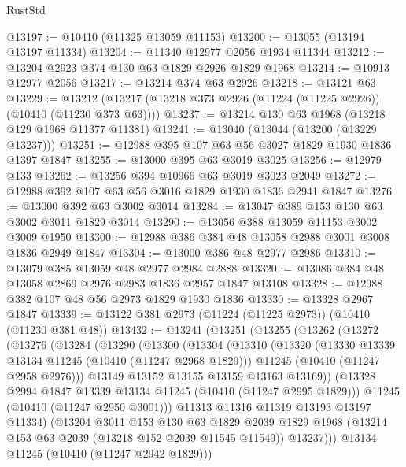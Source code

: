 \begin{lexlean}{RustStd}
\begin{coremodule}
@13197 := @10410 (@11325 @13059 @11153)
@13200 := @13055 (@13194 @13197 @11334)
@13204 := @11340 @12977 @2056 @1934 @11344
@13212 := @13204 @2923 @374 @130 @63 @1829 @2926 @1829 @1968
@13214 := @10913 @12977 @2056
@13217 := @13214 @374 @63 @2926
@13218 := @13121 @63
@13229 := @13212 (@13217 (@13218 @373 @2926 (@11224 (@11225 @2926)) (@10410 (@11230 @373 @63))))
@13237 := @13214 @130 @63 @1968 (@13218 @129 @1968 @11377 @11381)
@13241 := @13040 (@13044 (@13200 (@13229 @13237)))
@13251 := @12988 @395 @107 @63 @56 @3027 @1829 @1930 @1836 @1397 @1847
@13255 := @13000 @395 @63 @3019 @3025
@13256 := @12979 @133
@13262 := @13256 @394 @10966 @63 @3019 @3023 @2049
@13272 := @12988 @392 @107 @63 @56 @3016 @1829 @1930 @1836 @2941 @1847
@13276 := @13000 @392 @63 @3002 @3014
@13284 := @13047 @389 @153 @130 @63 @3002 @3011 @1829 @3014
@13290 := @13056 @388 @13059 @11153 @3002 @3009 @1950
@13300 := @12988 @386 @384 @48 @13058 @2988 @3001 @3008 @1836 @2949 @1847
@13304 := @13000 @386 @48 @2977 @2986
@13310 := @13079 @385 @13059 @48 @2977 @2984 @2888
@13320 := @13086 @384 @48 @13058 @2869 @2976 @2983 @1836 @2957 @1847 @13108
@13328 := @12988 @382 @107 @48 @56 @2973 @1829 @1930 @1836
@13330 := @13328 @2967 @1847
@13339 := @13122 @381 @2973 (@11224 (@11225 @2973)) (@10410 (@11230 @381 @48))
@13432 := @13241
    (@13251
      (@13255
        (@13262
          (@13272
            (@13276
              (@13284
                (@13290
                  (@13300
                    (@13304
                      (@13310
                        (@13320
                          (@13330 @13339 @13134 @11245 (@10410 (@11247 @2968 @1829)))
                          @11245
                          (@10410 (@11247 @2958 @2976)))
                        @13149
                        @13152
                        @13155
                        @13159
                        @13163
                        @13169))
                    (@13328 @2994 @1847 @13339 @13134 @11245 (@10410 (@11247 @2995 @1829)))
                    @11245
                    (@10410 (@11247 @2950 @3001)))
                  @11313
                  @11316
                  @11319
                  @13193
                  @13197
                  @11334)
                (@13204
                  @3011
                  @153
                  @130
                  @63
                  @1829
                  @2039
                  @1829
                  @1968
                  (@13214 @153 @63 @2039 (@13218 @152 @2039 @11545 @11549))
                  @13237)))
            @13134
            @11245
            (@10410 (@11247 @2942 @1829)))

\end{coremodule}
\end{lexlean}
